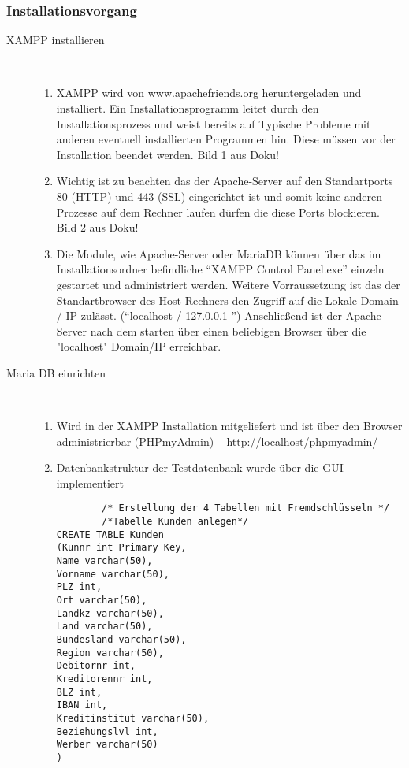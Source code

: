 \documentclass[a4paper, 12pt]{scrartcl}
\begin{document}
\subsubsection{Installationsvorgang}
\begin{description}
   \item[XAMPP installieren]~\par
   \begin{enumerate}
      \item XAMPP wird von www.apachefriends.org heruntergeladen und installiert. Ein Installationsprogramm leitet durch den Installationsprozess und weist bereits auf Typische Probleme mit anderen eventuell installierten Programmen hin. Diese müssen vor der Installation beendet werden.
      Bild 1 aus Doku!
      \item Wichtig ist zu beachten das der Apache-Server auf den Standartports 80 (HTTP) und 443 (SSL) eingerichtet ist und somit keine anderen Prozesse auf dem Rechner laufen dürfen die diese Ports blockieren.
      Bild 2 aus Doku!
      \item Die Module, wie Apache-Server oder MariaDB können über das im Installationsordner befindliche "`XAMPP Control Panel.exe"' einzeln gestartet und administriert werden.
      Weitere Vorraussetzung ist das der Standartbrowser des Host-Rechners den Zugriff auf die Lokale Domain / IP zulässt.  ("`localhost / 127.0.0.1 "')
      Anschließend ist der Apache-Server nach dem starten über einen beliebigen Browser über die "localhost" Domain/IP erreichbar.	
   \end{enumerate}
   \item[Maria DB einrichten]~\par
   \begin{enumerate}
      \item  Wird in der XAMPP Installation mitgeliefert und ist über den Browser administrierbar (PHPmyAdmin) -- http://localhost/phpmyadmin/
      \item Datenbankstruktur der Testdatenbank wurde über die GUI implementiert 
      \begin{verbatim}
      	/* Erstellung der 4 Tabellen mit Fremdschlüsseln */
      	/*Tabelle Kunden anlegen*/
CREATE TABLE Kunden
(Kunnr int Primary Key,
Name varchar(50),
Vorname varchar(50),
PLZ int,
Ort varchar(50),
Landkz varchar(50),
Land varchar(50),
Bundesland varchar(50),
Region varchar(50),
Debitornr int,
Kreditorennr int,
BLZ int,
IBAN int,
Kreditinstitut varchar(50),
Beziehungslvl int,
Werber varchar(50)
)



\end{verbatim}
\end{enumerate}
\end{description}
\end{document}
